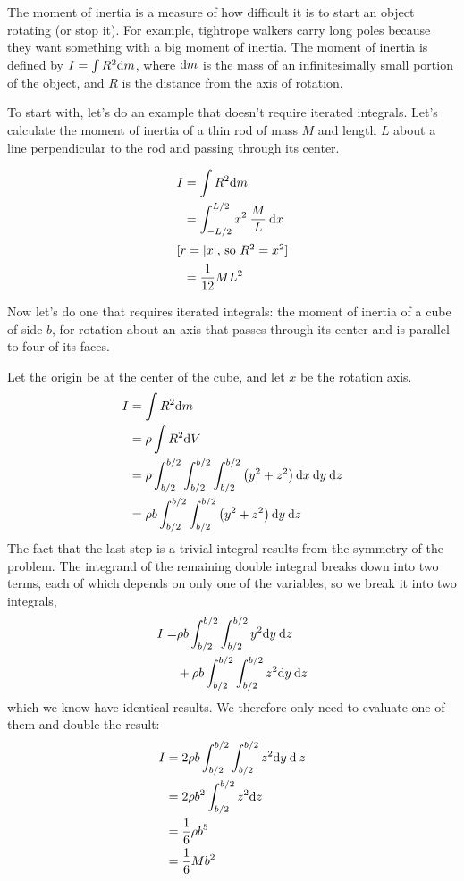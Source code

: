 \begin{eg}
The moment of inertia is a measure of how difficult
it is to start an object rotating (or stop it). For example, tightrope walkers
carry long poles because they want something with a big moment of inertia.
The moment of inertia is defined by $I=\int R^2 \textup{d} m$, where $\textup{d} m$ is
the mass of an infinitesimally small portion of the object, and $R$ is the
distance from the axis of rotation.

To start with, let's do an example that doesn't require iterated integrals.
Let's calculate the moment of inertia of a thin rod of
mass $M$ and length $L$ about a line perpendicular to the rod
and passing through its center.

\begin{align*}
	I	&= \int R^2 \textup{d} m \\
		&= \int_{-L/2}^{L/2} x^2\:\frac{M}{L}\:\textup{d} x \\
\intertext{[$r=|x|$, so $R^2=x^2$]}
		&= \frac{1}{12}ML^2
\end{align*}

Now let's do one that requires iterated integrals:
the moment of inertia of a cube of side $b$,
for rotation about an axis that passes through its center
and is parallel to four of its faces.

Let the origin be at the center of the cube, and
let $x$ be the rotation axis.
\begin{align*}
	I	&=  \int R^2 \textup{d} m \\
		&= \rho \int R^2 \textup{d} V \\
		&= \rho \int_{b/2}^{b/2} \int_{b/2}^{b/2} \int_{b/2}^{b/2} \left(y^2+z^2\right)
					 \textup{d} x\: \textup{d} y\: \textup{d} z \\
		&= \rho b \int_{b/2}^{b/2} \int_{b/2}^{b/2}  \left(y^2+z^2\right)
					 \textup{d} y \: \textup{d} z 
\end{align*}
The fact that the last step is a trivial integral results
from the symmetry of the problem. The integrand of the
remaining double integral breaks down into two terms, each
of which depends on only one of the variables, so we break
it into two integrals,
\begin{align*}
		I =& \rho b \int_{b/2}^{b/2} \int_{b/2}^{b/2}  y^2 \textup{d} y\: \textup{d} z \\
			&+ \rho b \int_{b/2}^{b/2} \int_{b/2}^{b/2}  z^2 \textup{d} y\: \textup{d} z
\end{align*}
which we know have identical results. We therefore only need
to evaluate one of them and double the result:
\begin{align*}
	I	&= 2\rho b \int_{b/2}^{b/2} \int_{b/2}^{b/2}  z^2 \textup{d} y\: \textup{d}\: z \\
		&= 2 \rho b^2 \int_{b/2}^{b/2} z^2 \textup{d} z \\
		&= \frac{1}{6} \rho b^5 \\
		&= \frac{1}{6} M b^2
\end{align*}
\end{eg}

